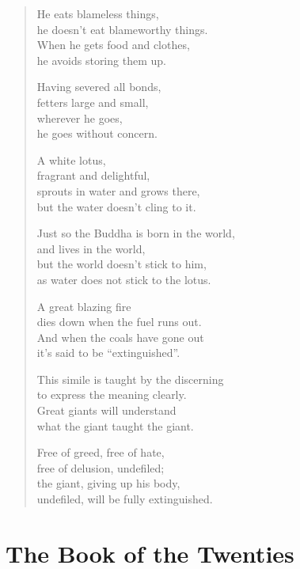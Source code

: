 \documentclass[12pt,openany]{book}%
\let\oldcontentsline\contentsline
\newcommand{\nopagecontentsline}[3]{\oldcontentsline{#1}{#2}{}}
\begin{document}
\begin{verse}
He eats blameless things, \\
he doesn’t eat blameworthy things. \\
When he gets food and clothes, \\
he avoids storing them up. 

Having severed all bonds, \\
fetters large and small, \\
wherever he goes, \\
he goes without concern. 

A white lotus, \\
fragrant and delightful, \\
sprouts in water and grows there, \\
but the water doesn’t cling to it. 

Just so the Buddha is born in the world, \\
and lives in the world, \\
but the world doesn’t stick to him, \\
as water does not stick to the lotus. 

A great blazing fire \\
dies down when the fuel runs out. \\
And when the coals have gone out \\
it’s said to be “extinguished”. 

This simile is taught by the discerning \\
to express the meaning clearly. \\
Great giants will understand \\
what the giant taught the giant. 

Free of greed, free of hate, \\
free of delusion, undefiled; \\
the giant, giving up his body, \\
undefiled, will be fully extinguished. 

%
\end{verse}

%
\part*{The Book of the Twenties }
\markboth{}{}
\addtocontents{toc}{\let\protect\contentsline\protect\oldcontentsline}
\end{document}
